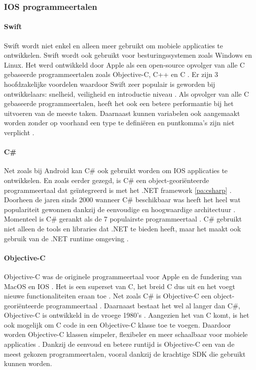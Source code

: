 \subsubsection{IOS programmeertalen}
\paragraph{Swift}
Swift wordt niet enkel en alleen meer gebruikt om mobiele applicaties te ontwikkelen. 
Swift wordt ook gebruikt voor besturingssystemen zoals Windows en Linux. Het werd 
ontwikkeld door Apple als een open-source opvolger van alle C gebaseerde programmeertalen 
zoals Objective-C, C++ en C \autocite{Coursera2022}. Er zijn 3 hoofdzakelijke voordelen 
waardoor Swift zeer populair is geworden bij ontwikkelaars: snelheid, veiligheid en 
introductie niveau \autocite{yuvraj2022}. Als opvolger van alle C gebaseerde programmeertalen, 
heeft het ook een betere performantie bij het uitvoeren van de meeste taken. Daarnaast kunnen 
variabelen ook aangemaakt worden zonder op voorhand een type te definiëren en puntkomma's 
zijn niet verplicht \autocite{Thorndyke2021}.

\paragraph{C\#}
Net zoals bij Android kan C\# ook gebruikt worden om IOS applicaties te ontwikkelen. 
En zoals eerder gezegd, is C\# een object-georiënteerde programmeertaal dat geïntegreerd 
is met het .NET framework \ref{pa:csharp} \autocite{yuvraj2022}. Doorheen de jaren sinds 
2000 wanneer C\# beschikbaar was heeft het heel wat populariteit gewonnen dankzij de 
eenvoudige en hoogwaardige architectuur \autocite{yuvraj2022}. Momenteel is C\# gerankt 
als de 7 populairste programmeertaal \autocite{Johns2023}. C\# gebruikt niet alleen de 
tools en libraries dat .NET te bieden heeft, maar het maakt ook gebruik van de .NET runtime 
omgeving \autocite{Pruciak2022}.

\paragraph{Objective-C}
Objective-C was de originele programmeertaal voor Apple en de fundering van MacOS en 
IOS \autocite{Johns2023}. Het is een \Gls{superset} van C, het breid C dus uit en het 
voegt nieuwe functionaliteiten eraan toe \autocite{Johns2023}. Net zoals C\# is Objective-C 
een object-georiënteerde programmeertaal \autocite{Pruciak2022}. Daarnaast bestaat 
het wel al langer dan C\#, Objective-C is ontwikkeld in de vroege 1980's \autocite{Pruciak2022}. 
Aangezien het van C komt, is het ook mogelijk om C code in een Objective-C klasse toe 
te voegen. Daardoor worden Objective-C klassen simpeler, flexibeler en meer schaalbaar 
voor mobiele applicaties \autocite{yuvraj2022}. Dankzij de eenvoud en betere runtijd is 
Objective-C een van de meest gekozen programmeertalen, vooral dankzij de krachtige \Gls{SDK} 
die gebruikt kunnen worden.

